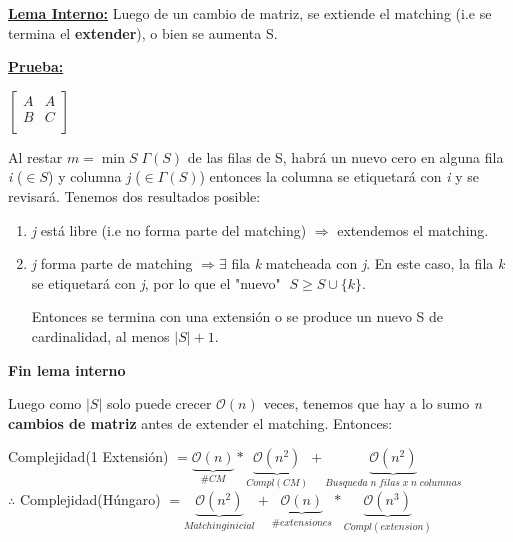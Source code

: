 \documentclass[12pt,a4paper]{report}
\begin{document}
\begin{enumerate}
				\underline{\textbf{Lema Interno:}} Luego de un cambio de matriz, se extiende el matching (i.e se termina el \textbf{extender}), o bien se aumenta S.
				
				\underline{\textbf{Prueba:}} 
				
				\begin{center}
				$
				\begin{bmatrix}
				A & A \\
				B  & C \\
				\end{bmatrix}					
				$
				\end{center}				
				
				Al restar $\textit{m} = \min S \; \Gamma(S)$ de las filas de S, habrá un nuevo cero en alguna fila \textit{i} ($\in S$) y columna \textit{j} ($\in \Gamma(S)$) entonces la columna se etiquetará con \textit{i} y se revisará.
				Tenemos dos resultados posible:
				\begin{enumerate}
					\item \textit{j} está libre (i.e no forma parte del matching) $\Rightarrow$ extendemos el matching.
					\item \textit{j} forma parte de matching $\Rightarrow \exists$ fila \textit{k} matcheada con \textit{j}. En este caso, la fila \textit{k} se etiquetará con \textit{j}, por lo que el "nuevo" $\; S \geq S \cup \{\textit{k}\}$.
					
					\vspace{5mm}
					Entonces se termina con una extensión o se produce un nuevo S de cardinalidad, al menos $\lvert S \rvert + 1$.
				\end{enumerate}
				
				\textbf{Fin lema interno}
				
				Luego como $\lvert S \rvert$ solo puede crecer $\mathcal{O}(n)$ veces, tenemos que hay a lo sumo \textit{n} \textbf{cambios de matriz} antes de extender el matching. Entonces:
				
							\begin{center}
								Complejidad(1 Extensión) $= \underbrace{\mathcal{O}(n)}_{\# CM} * \underbrace{\mathcal{O}(n^{2})}_{Compl(CM)} + \underbrace{\mathcal{O}(n^{2})}_{Busqueda \; \textit{n} \; filas \; x \; \textit{n} \; columnas }$ \\
								\vspace{5mm}
								$\therefore$ Complejidad(Húngaro) $= \underbrace{\mathcal{O}(n^{2})}_{Matching inicial} + \underbrace{\mathcal{O}(n)}_{\#extensiones} * \underbrace{\mathcal{O}(n^{3})}_{Compl(extension)}$
							\end{center}				
			\end{enumerate}
	
\end{document}
